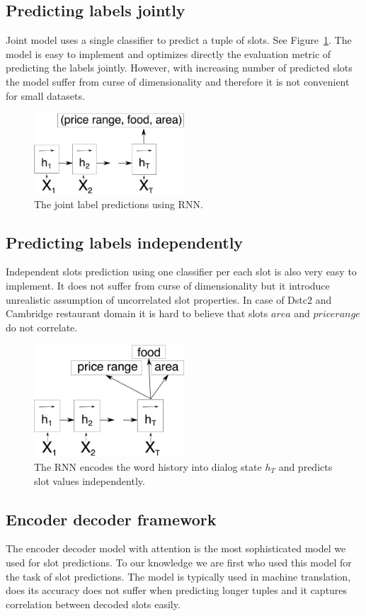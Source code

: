 \documentclass{itatnew}
\begin{document}
\subsection{Predicting labels jointly}
Joint model uses a single classifier to predict a tuple of slots. 
See Figure~\ref{fig:encjoint}.
The model is easy to implement and optimizes directly the evaluation metric of predicting the labels jointly.
However, with increasing number of predicted slots the model suffer from curse of dimensionality and therefore it is not convenient for small datasets.
\begin{figure}
\includegraphics[width=0.5\textwidth]{encoder_joint}
\caption{The joint label predictions using RNN.}
\label{fig:encjoint}
\end{figure}

\subsection{Predicting labels independently}
Independent slots prediction using one classifier per each slot is also very easy to implement.
It does not suffer from curse of dimensionality but it introduce unrealistic assumption of uncorrelated slot properties.
In case of Dstc2 and Cambridge restaurant domain it is hard to believe that slots $area$ and $price range$ do not correlate.
\begin{figure}
\includegraphics[width=0.5\textwidth]{encoder}
\caption{The RNN encodes the word history into dialog state $h_T$ and predicts slot values independently.}
\label{fig:encind}
\end{figure}

\subsection{Encoder decoder framework}
The encoder decoder model with attention\cite{Bahdanout} is the most sophisticated model we used for slot predictions.
To our knowledge we are first who used this model for the task of slot predictions.
The model is typically used in machine translation, does its accuracy does not suffer when predicting longer tuples\cite{Bahdnadou} and it captures correlation between decoded slots easily\cite{LM with attention}.
\end{document}
